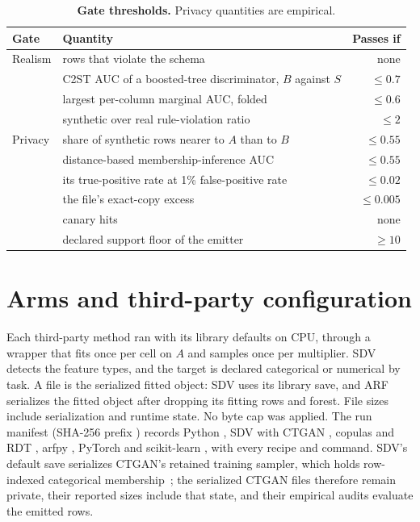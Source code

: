 \documentclass[10pt,letterpaper,twocolumn]{article}
\newcommand{\ct}[1]{{\bfseries\color{ink}#1}}   %
\newcommand{\cli}[1]{{\ttfamily\fontsize{8.9}{11}\selectfont #1}}
\newcommand{\tablefont}{\fontsize{8.1}{10.2}\selectfont}
\newcommand{\thd}[1]{{\sffamily\bfseries\fontsize{7.2}{9}\selectfont\color{ink}#1}}  %
\begin{document}
\begin{table}[H]
\caption{\ct{Gate thresholds.} Privacy quantities are empirical.}\label{tab:gates}
\tablefont
\begin{tabularx}{\columnwidth}{@{}L{1.05cm}Yr@{}}
\toprule
\thd{Gate} & \thd{Quantity} & \thd{Passes if}\\
\midrule
Realism & rows that violate the schema & none\\
 & C2ST AUC of a boosted-tree discriminator, $B$ against $S$ & $\le 0.7$\\
 & largest per-column marginal AUC, folded & $\le 0.6$\\
 & synthetic over real rule-violation ratio & $\le 2$\\
\midrule
Privacy & share of synthetic rows nearer to $A$ than to $B$ & $\le 0.55$\\
 & distance-based membership-inference AUC & $\le 0.55$\\
 & its true-positive rate at 1\% false-positive rate & $\le 0.02$\\
 & the file's exact-copy excess & $\le 0.005$\\
 & canary hits & none\\
 & declared support floor of the emitter & $\ge 10$\\
\bottomrule
\end{tabularx}
\end{table}

\section{Arms and third-party configuration}\label{app:arms}
Each third-party method ran with its library defaults on CPU, through a wrapper that fits once per cell on $A$ and samples once per multiplier. SDV detects the feature types, and the target is declared categorical or numerical by task. A file is the serialized fitted object: SDV uses its library save, and ARF serializes the fitted object after dropping its fitting rows and forest. File sizes include serialization and runtime state. No byte cap was applied. The run manifest (SHA-256 prefix \cli{}) records Python , SDV  with CTGAN , copulas  and RDT , arfpy , PyTorch  and scikit-learn , with every recipe and command. SDV's default save serializes CTGAN's retained training sampler, which holds row-indexed categorical membership~\cite{ctgan013sampler,sdv22save}; the serialized CTGAN files therefore remain private, their reported sizes include that state, and their empirical audits evaluate the emitted rows.
\end{document}
